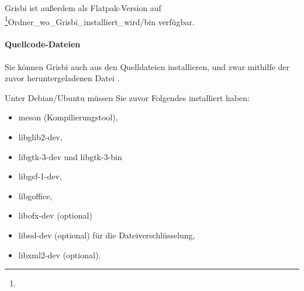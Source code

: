 Grisbi ist außerdem als Flatpak-Version auf \footnote{\urlFlatpakGrisbi}Ordner\_wo\_Grisbi\_installiert\_wird/bin verfügbar.

\paragraph{Quellcode-Dateien}\mbox{}		%

Sie können Grisbi auch aus den Quelldateien installieren, und zwar mithilfe der zuvor heruntergeladenen Datei .

Unter Debian/Ubuntu müssen Sie zuvor Folgendes installiert haben:
\begin{itemize}
\item  meson (Kompilierungstool),
\item libglib2-dev,
\item libgtk-3-dev und libgtk-3-bin
\item libgsf-1-dev,
\item libgoffice,
\item libofx-dev (optional)%
\item libssl-dev (optional) für die Dateiverschlüsselung,%
\item libxml2-dev (optional).
\end{itemize}


